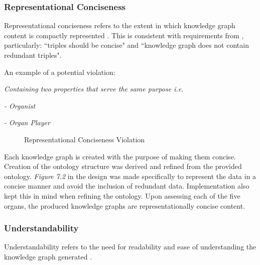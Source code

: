 \subsubsection{Representational Conciseness}
\hspace{0.5cm} Representational conciseness refers to the extent in which knowledge graph content is compactly represented \cite{knowledgegraphevaulationbook}. This is consistent with requirements from \cite{evaluationpaper}, particularly: ``triples should be concise" and ``knowledge graph does not contain redundant triples".

\noindent An example of a potential violation: 
\vspace{-0.1cm}
\begin{displayquote}
    \textit{Containing two properties that serve the same purpose i.e.}
\end{displayquote}
\vspace{-0.65cm}
\begin{displayquote}
    \textit{- Organist}
\end{displayquote}
\vspace{-0.825cm}
\begin{displayquote}
    \textit{- Organ Player}
\end{displayquote}

\begin{figure}[H]
\begin{center}
\end{center}
\vspace{-0.5cm}
\caption{Representational Conciseness Violation}
\end{figure}

Each knowledge graph is created with the purpose of making them concise. Creation of the ontology structure was derived and refined from the provided ontology. \textit{Figure 7.2} in the design was made specifically to represent the data in a concise manner and avoid the inclusion of redundant data. Implementation also kept this in mind when refining the ontology. Upon assessing each of the five organs, the produced knowledge graphs are representationally concise content.

\subsubsection{Understandability}
\hspace{0.5cm} Understandability refers to the need for readability and ease of understanding the knowledge graph generated \cite{knowledgegraphevaulationbook}.

